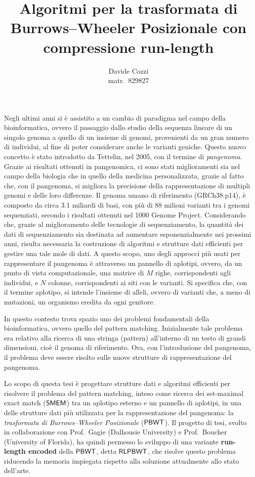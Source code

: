 \documentclass[a4paper,11pt, oneside,italian]{article}
\title{Algoritmi per la trasformata di Burrows--Wheeler
  Posizionale con compressione run-length}
\author{Davide Cozzi\\\smaller matr.~829827}
\date{}
\def\PBWT{\mbox{\rm {\sf PBWT}}}
\def\RLPBWT{\mbox{\rm {\sf RLPBWT}}}
\def\SMEM{\mbox{\rm {\sf SMEM}}}
\begin{document}
\maketitle
{}
\noindent
Negli ultimi anni si è assistito a un cambio di paradigma nel campo della
bioinformatica, ovvero il passaggio dallo studio della sequenza lineare di un
singolo genoma a quello di un insieme di genomi, provenienti da un gran numero
di individui, al fine di poter considerare anche le varianti
  geniche. Questo nuovo concetto è stato introdotto da
Tettelin, nel 2005, con il termine di \textit{pangenoma}. Grazie ai risultati
ottenuti in pangenomica, ci sono stati miglioramenti sia nel 
campo della biologia che in quello della medicina personalizzata, grazie al
fatto che, con il pangenoma, si migliora la precisione della rappresentazione di
multipli genomi e delle loro differenze. 
Il genoma umano di riferimento (GRCh38.p14), è composto da circa
3.1 miliardi di basi, con più di 88 milioni 
varianti tra i genomi sequenziati, secondo i risultati ottenuti nel 1000 Genome
Project. Considerando che, grazie al
miglioramento delle tecnologie di sequenziamento, la quantità dei dati di
sequenziamento sia destinata 
ad aumentare esponenzialmente nei prossimi anni, risulta necessaria la
costruzione di algoritmi e   
strutture dati efficienti per gestire una tale mole di dati.
A questo scopo, uno degli approcci più usati per rappresentare il pangenoma è
attraverso un 
pannello di aplotipi, ovvero, da un punto di vista computazionale, una matrice
di $M$ 
righe, corrispondenti agli individui, e $N$ colonne, corrispondenti ai siti con
le varianti. Si specifica che, con il termine
aplotipo, si intende l'insieme di alleli, ovvero di varianti che, a meno di
mutazioni, un organismo eredita da ogni genitore.

In questo contesto trova spazio uno dei problemi fondamentali della
bioinformatica, ovvero quello del pattern matching. Inizialmente tale problema
era relativo alla ricerca di una stringa (pattern) all'interno di un testo di
grandi dimensioni, cioè il genoma di riferimento.
Ora, con l'introduzione del pangenoma, il problema deve essere risolto sulle
nuove strutture 
di rappresentazione del pangenoma.

Lo scopo di questa tesi è progettare strutture dati e algoritmi efficienti per
risolvere il problema del pattern 
matching, inteso come ricerca dei set-maximal exact match ($\SMEM$) tra un
aplotipo 
esterno e un pannello di aplotipi, in una delle 
strutture dati più utilizzata per la rappresentazione del pangenoma: la
\textit{trasformata di Burrows--Wheeler 
  Posizionale} ($\PBWT$). Il progetto di tesi, svolto in collaborazione con
Prof.~Gagie (Dalhousie University) e Prof.~Boucher 
(University of Florida), ha quindi permesso lo sviluppo di una variante
\textbf{run-length encoded} della $\PBWT$, detta $\RLPBWT$, che
risolve questo problema riducendo la memoria impiegata rispetto
alla soluzione attualmente allo stato dell'arte.
\end{document}
